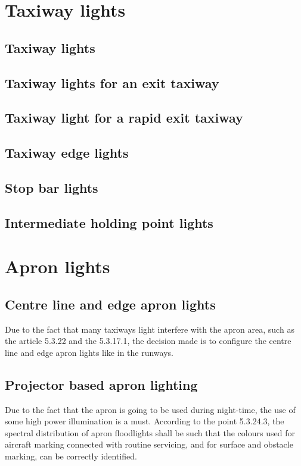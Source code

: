 	\section{Taxiway lights}
		\subsection{Taxiway lights}
		\subsection{Taxiway lights for an exit taxiway}
		\subsection{Taxiway light for a rapid exit taxiway}
		\subsection{Taxiway edge lights}
		\subsection{Stop bar lights}
		\subsection{Intermediate holding point lights}
	
	\section{Apron lights}
		\subsection{Centre line and edge apron lights}
		Due to the fact that many taxiways light interfere with the apron area, such as the article 5.3.22 and the 5.3.17.1, the decision made is to configure the centre line and edge apron lights like in the runways.
	
		\subsection{Projector based apron lighting}
		Due to the fact that the apron is going to be used during night-time, the use of some high power illumination is a must. According to the point 5.3.24.3, the spectral distribution of apron floodlights shall be such that the colours used for aircraft marking connected with routine servicing, and for surface and obstacle marking, can be correctly identified.
		
